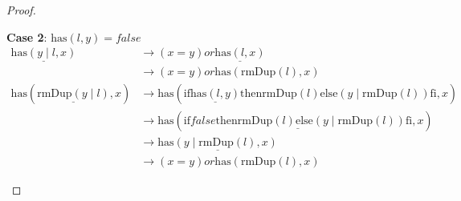 \documentclass[12pt, a4paper]{article}
\newcommand{\rel}[1]{\mathrel{#1}}
\newcommand{\rmx}[1]{\mathrm{#1}}
\newcommand{\larrow}{\longrightarrow}
\newcommand{\under}{\underline}
\begin{document}
\begin{proof}
\begin{description}
\textbf{Case 2}: $\rmx{has}(l, y) = false$
\begin{align*}
\under{\rmx{has}(y \mid l, x)}
	&\larrow (x = y) \rel{or} \under{\rmx{has}(l, x)} \tag{by has2} \\
	&\larrow (x = y) \rel{or} \rmx{has}(\rmx{rmDup}(l), x) \tag{by IH} \\
\rmx{has}(\under{\rmx{rmDup}(y \mid l)}, x)
	&\larrow \rmx{has}(\rel{\rmx{if}} \under{\rmx{has}(l, y)} \rel{\rmx{then}} \rmx{rmDup}(l) \rel{\rmx{else}} (y \mid \rmx{rmDup}(l)) \rel{\rmx{fi}}, x) \tag{by rmDup2} \\
	&\larrow \rmx{has}(\under{\rel{\rmx{if}} false \rel{\rmx{then}} \rmx{rmDup}(l) \rel{\rmx{else}} (y \mid \rmx{rmDup}(l)) \rel{\rmx{fi}}}, x) \tag{by case splitting} \\
	&\larrow \under{\rmx{has}(y \mid \rmx{rmDup}(l), x)} \tag{by if2} \\
	&\larrow (x = y) \rel{or} \rmx{has}(\rmx{rmDup}(l), x) \tag{by has2}
\end{align*}
\end{description}
\end{proof}
\end{document}
